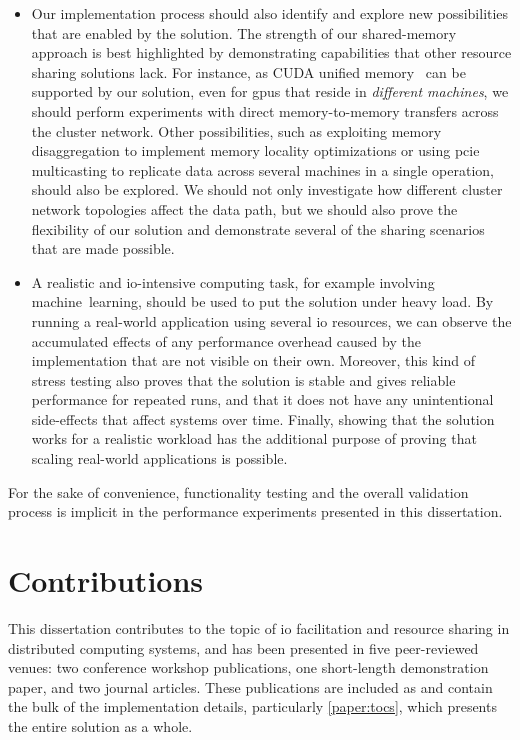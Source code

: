 \begin{itemize}
    \item 
        Our implementation process should also identify and explore new possibilities that are enabled by the solution.
        The strength of our shared-memory approach is best highlighted by demonstrating capabilities that other resource sharing solutions lack.
        For instance, as CUDA unified memory~\cite{url:unified-memory} can be supported by our solution, even for \glspl{gpu} that reside in \emph{different machines}, we should perform experiments with direct memory-to-memory transfers across the cluster network.
        Other possibilities, such as exploiting memory \gls{disaggregation} to implement memory locality optimizations or using \gls{pcie} \gls{multicasting} to replicate data across several machines in a single operation, should also be explored.
        We should not only investigate how different cluster network topologies affect the data path, but we should also prove the flexibility of our solution and demonstrate several of the sharing scenarios that are made possible.

    \item
        A realistic and \gls{io}-intensive computing task, for example involving machine~learning, should be used to put the solution under heavy load.
        By running a real-world application using several \gls{io} resources, we can observe the accumulated effects of any performance overhead caused by the implementation that are not visible on their own.
        Moreover, this kind of stress testing also proves that the solution is stable and gives reliable performance for repeated runs, and that it does not have any unintentional side-effects that affect systems over time.
        Finally, showing that the solution works for a realistic workload has the additional purpose of proving that scaling real-world applications is possible.

\end{itemize}
%
For the sake of convenience, functionality testing and the overall validation process is implicit in the performance experiments presented in this dissertation.



\section{Contributions}
This dissertation contributes to the topic of \gls{io} facilitation and resource sharing in distributed computing systems, and has been presented in five peer-reviewed venues: two conference workshop publications, one short-length demonstration paper, and two journal articles.
These publications are included as  and contain the bulk of the implementation details, particularly \cref{paper:tocs}, which presents the entire solution as a whole.

